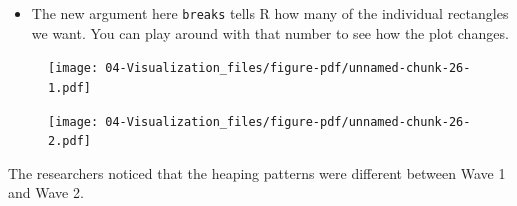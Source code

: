 \documentclass[
  letterpaper,
  DIV=11,
  numbers=noendperiod]{scrreprt}
\newenvironment{Shaded}{\begin{snugshade}}{\end{snugshade}}
\newcommand{\AttributeTok}[1]{\textcolor[rgb]{0.40,0.45,0.13}{#1}}
\newcommand{\DecValTok}[1]{\textcolor[rgb]{0.68,0.00,0.00}{#1}}
\newcommand{\FunctionTok}[1]{\textcolor[rgb]{0.28,0.35,0.67}{#1}}
\newcommand{\NormalTok}[1]{\textcolor[rgb]{0.00,0.23,0.31}{#1}}
\newcommand{\SpecialCharTok}[1]{\textcolor[rgb]{0.37,0.37,0.37}{#1}}
\newcommand{\StringTok}[1]{\textcolor[rgb]{0.13,0.47,0.30}{#1}}
\providecommand{\tightlist}{%
  \setlength{\itemsep}{0pt}\setlength{\parskip}{0pt}}\usepackage{longtable,booktabs,array}
\begin{document}
\begin{itemize}
\tightlist
\item
  The new argument here \texttt{breaks} tells R how many of the
  individual rectangles we want. You can play around with that number to
  see how the plot changes.
\end{itemize}

\begin{Shaded}
\end{Shaded}

\begin{figure}[H]

{\centering \texttt{[image: 04-Visualization\_files/figure-pdf/unnamed-chunk-26-1.pdf]}

}

\end{figure}

\begin{Shaded}
\end{Shaded}

\begin{figure}[H]

{\centering \texttt{[image: 04-Visualization\_files/figure-pdf/unnamed-chunk-26-2.pdf]}

}

\end{figure}

The researchers noticed that the heaping patterns were different between
Wave 1 and Wave 2.
\end{document}

